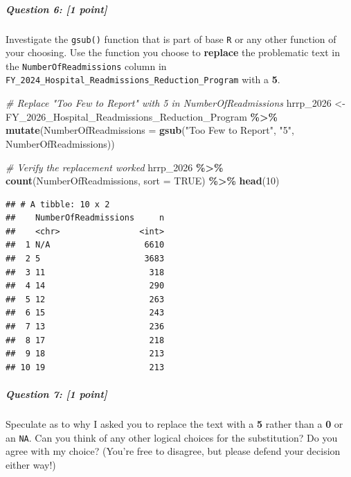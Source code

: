 \documentclass[
]{article}
\newenvironment{Shaded}{\begin{snugshade}}{\end{snugshade}}
\newcommand{\AttributeTok}[1]{\textcolor[rgb]{0.13,0.29,0.53}{#1}}
\newcommand{\CommentTok}[1]{\textcolor[rgb]{0.56,0.35,0.01}{\textit{#1}}}
\newcommand{\ConstantTok}[1]{\textcolor[rgb]{0.56,0.35,0.01}{#1}}
\newcommand{\DecValTok}[1]{\textcolor[rgb]{0.00,0.00,0.81}{#1}}
\newcommand{\FunctionTok}[1]{\textcolor[rgb]{0.13,0.29,0.53}{\textbf{#1}}}
\newcommand{\NormalTok}[1]{#1}
\newcommand{\OtherTok}[1]{\textcolor[rgb]{0.56,0.35,0.01}{#1}}
\newcommand{\SpecialCharTok}[1]{\textcolor[rgb]{0.81,0.36,0.00}{\textbf{#1}}}
\newcommand{\StringTok}[1]{\textcolor[rgb]{0.31,0.60,0.02}{#1}}
\begin{document}
\subparagraph{\texorpdfstring{\textbf{Question 6}: {[}1
point{]}}{Question 6: {[}1 point{]}}}\label{question-6-1-point}

Investigate the \texttt{gsub()} function that is part of base \texttt{R}
or any other function of your choosing. Use the function you choose to
\textbf{replace} the problematic text in the
\texttt{NumberOfReadmissions} column in
\texttt{FY\_2024\_Hospital\_Readmissions\_Reduction\_Program} with a
\textbf{5}.

\begin{Shaded}
\begin{Highlighting}[]
\CommentTok{\# Replace "Too Few to Report" with 5 in NumberOfReadmissions}
\NormalTok{hrrp\_2026 }\OtherTok{\textless{}{-}}\NormalTok{ FY\_2026\_Hospital\_Readmissions\_Reduction\_Program }\SpecialCharTok{\%\textgreater{}\%}
    \FunctionTok{mutate}\NormalTok{(}\AttributeTok{NumberOfReadmissions =} \FunctionTok{gsub}\NormalTok{(}\StringTok{"Too Few to Report"}\NormalTok{, }\StringTok{"5"}\NormalTok{, NumberOfReadmissions))}

\CommentTok{\# Verify the replacement worked}
\NormalTok{hrrp\_2026 }\SpecialCharTok{\%\textgreater{}\%}
    \FunctionTok{count}\NormalTok{(NumberOfReadmissions, }\AttributeTok{sort =} \ConstantTok{TRUE}\NormalTok{) }\SpecialCharTok{\%\textgreater{}\%}
    \FunctionTok{head}\NormalTok{(}\DecValTok{10}\NormalTok{)}
\end{Highlighting}
\end{Shaded}

\begin{verbatim}
## # A tibble: 10 x 2
##    NumberOfReadmissions     n
##    <chr>                <int>
##  1 N/A                   6610
##  2 5                     3683
##  3 11                     318
##  4 14                     290
##  5 12                     263
##  6 15                     243
##  7 13                     236
##  8 17                     218
##  9 18                     213
## 10 19                     213
\end{verbatim}

\subparagraph{\texorpdfstring{\textbf{Question 7}: {[}1
point{]}}{Question 7: {[}1 point{]}}}\label{question-7-1-point}

Speculate as to why I asked you to replace the text with a \textbf{5}
rather than a \textbf{0} or an \texttt{NA}. Can you think of any other
logical choices for the substitution? Do you agree with my choice?
(You're free to disagree, but please defend your decision either way!)
\end{document}
